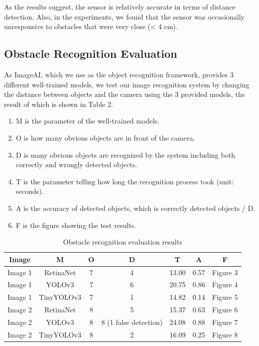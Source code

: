 As the results suggest, the sensor is relatively accurate in terms of distance detection. Also, in the experiments, we found that the sensor was occasionally unresponsive to obstacles that were very close (< 4 cm).

\subsection{Obstacle Recognition Evaluation} 
As ImageAI, which we use as the object recognition framework, provides 3 different well-trained models, we test our image recognition system by changing the distance between objects and the camera using the 3 provided models, the result of which is shown in Table 2.
\begin{enumerate}
  \item M is the parameter of the well-trained models.
  \item O is how many obvious objects are in front of the camera.
  \item D is many obvious objects are recognized by the system including both correctly and wrongly detected objects.
  \item T is the parameter telling how long the recognition process took (unit: seconds).
  \item A is the accuracy of detected objects, which is correctly detected objects / D.
  \item F is the figure showing the test results.
\end{enumerate}




\begin{table}
  \caption{Obstacle recognition evaluation results} 
  \label{tab:freq}
  \begin{tabular}{ccccccc}
    \toprule
    Image & M & O & D & T & A & F \\
    \midrule
    Image 1 & RetinaNet & 7 & 4 & 13.00 & 0.57 & Figure 3 \\
    Image 1 & YOLOv3 & 7 & 6 & 20.75 & 0.86 & Figure 4 \\
    Image 1 & TinyYOLOv3 & 7 & 1 & 14.82 & 0.14 & Figure 5  \\
    Image 2 & RetinaNet & 8 & 5 & 15.37 & 0.63 & Figure 6  \\
    Image 2 & YOLOv3 & 8 & 8 (1 false detection) & 24.08 & 0.88 & Figure 7 \\
    Image 2 & TinyYOLOv3 & 8 & 2 & 16.09 & 0.25 & Figure 8 \\
  \bottomrule
\end{tabular}
\end{table}

